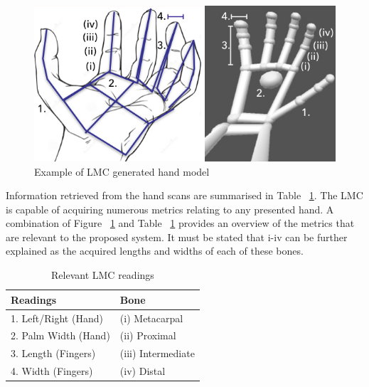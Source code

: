 
  
\begin{figure}[htbp!] 
\centering    
\includegraphics[width=1.0\textwidth]{Chapter2/Figs/Example_of_LMC_generated_hand_model.jpeg}
\caption[Example of LMC generated hand model]{Example of LMC generated hand model}
\label{fig:Example_of_LMC_generated_hand_model}
\end{figure}

\begin{figure}
\centering
\def\svgwidth{\columnwidth}

\end{figure}



Information retrieved from the hand scans are summarised in Table ~\ref{table: Relevant LMC readings}. The LMC is capable of acquiring numerous metrics relating to any presented hand. A combination of Figure ~\ref{fig:Example_of_LMC_generated_hand_model} and Table ~\ref{table: Relevant LMC readings} provides an overview of the metrics that are relevant to the proposed system. It must be stated that i-iv can be further explained as the acquired lengths and widths of each of these bones.

\begin{table}[h]
\caption{Relevant LMC readings}
\centering
 \begin{tabular}{|p{} | p{}|} 
 \hline
	\textbf{Readings} & \textbf{Bone} \\ [1ex] 
 \hline\hline 
 1.	Left/Right (Hand) & (i) Metacarpal \\[1ex]
 \hline 
 2.	Palm Width (Hand) & (ii) Proximal \\[1ex]
 \hline
 3.	Length (Fingers) & (iii) Intermediate \\ [1ex] 
 \hline
 4.	Width (Fingers) & (iv) Distal \\ [1ex] 
 \hline
 \end{tabular}
 \label{table: Relevant LMC readings}
\end{table}


